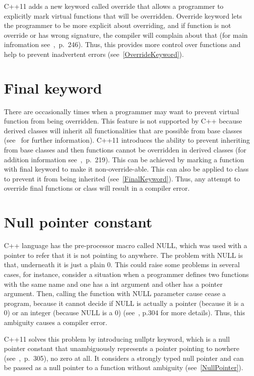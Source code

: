 \documentclass[11pt]{report}
\begin{document}
C++11 adds a new keyword called override that allows a programmer to explicitly mark virtual functions that will be overridden. Override keyword lets the programmer to be more explicit about overriding, and if function is not override or has wrong signature, the compiler will complain about that (for main infromation see~\cite{Gregorie:professionalcpp},~p.~246). Thus, this provides more control over functions and help to prevent inadvertent errors (see~\ref{OverrideKeyword}).

\section{Final keyword}
\label{section: Final keyword}
There are occasionally times when a programmer may want to prevent virtual function from being overridden. This feature is not supported by C++ because derived classes will inherit all functionalities that are possible from base classes (see~\cite{Stroustrup:2012:Cpp11} for further information). C++11 introduces the ability to prevent inheriting from base classes and then functions cannot be overridden in derived classes (for addition information see~\cite{Gregorie:professionalcpp},~p.~219). This can be achieved by marking a function with final keyword to make it non-override-able. This can also be applied to class to prevent it from being inherited (see~\ref{FinalKeyword}). Thus, any attempt to override final functions or class will result in a compiler error.

\section{Null pointer constant}
\label{section: Null pointer constant}
C++ language has the pre-processor macro called NULL, which was used with a pointer to refer that it is not pointing to anywhere. The problem with NULL is that, underneath it is just a plain 0. This could raise some problems in several cases, for instance, consider a situation when a programmer defines two functions with the same name and one has a int argument and other has a pointer argument. Then, calling the function with NULL parameter cause cease a program, because it cannot decide if NULL is actually a pointer (because it is a 0) or an integer (because NULL is a 0) (see~\cite{Gregorie:professionalcpp}, p.304 for more details). Thus, this ambiguity causes a compiler error.

C++11 solves this problem by introducing nullptr keyword, which is a null pointer constant that unambiguously represents a pointer pointing to nowhere (see~\cite{Gregorie:professionalcpp},~p.~305), no zero at all. It considers a strongly typed null pointer and can be passed as a null pointer to a function without ambiguity (see~\ref{NullPointer}). 
\end{document}
